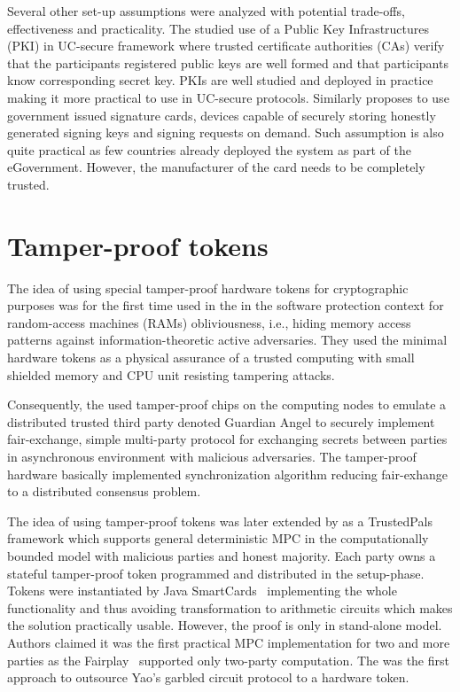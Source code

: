 \documentclass[
  digital, %
  twoside, %
  table,   %
  lof,     %
  lot,     %
]{fithesis3}
\begin{document}
Several other set-up assumptions were analyzed with potential trade-offs, effectiveness and practicality. The \cite{BCNP04} studied use of a Public Key Infrastructures (PKI) in UC-secure framework where trusted certificate authorities (CAs) verify that the participants registered public keys are well formed and that participants know corresponding secret key. PKIs are well studied and deployed in practice making it more practical to use in UC-secure protocols. Similarly \cite{HUU07} proposes to use government issued signature cards, devices capable of securely storing honestly generated signing keys and signing requests on demand. Such assumption is also quite practical as few countries already deployed the system as part of the eGovernment. However, the manufacturer of the card needs to be completely trusted.

\section{Tamper-proof tokens}
The idea of using special tamper-proof hardware tokens for cryptographic purposes was for the first time used in the \cite{GO96} in the software protection context for random-access machines (RAMs) obliviousness, i.e., hiding memory access patterns against information-theoretic active adversaries. They used the minimal hardware tokens as a physical assurance of a trusted computing with small shielded memory and CPU unit resisting tampering attacks.

Consequently, the \cite{AV04} used tamper-proof chips on the computing nodes to emulate a distributed trusted third party denoted Guardian Angel to securely implement fair-exchange, simple multi-party protocol for exchanging secrets between parties in asynchronous environment with malicious adversaries. The tamper-proof hardware basically implemented synchronization algorithm reducing fair-exhange to a distributed consensus problem. 

The idea of using tamper-proof tokens was later extended by \cite{FFPBK06} as a TrustedPals framework which supports general deterministic MPC in the computationally bounded model with malicious parties and honest majority. Each party owns a stateful tamper-proof token programmed and distributed in the setup-phase. Tokens were instantiated by Java SmartCards~\cite{DW99} implementing the whole functionality and thus avoiding transformation to arithmetic circuits which makes the solution practically usable. However, the proof is only in stand-alone model. Authors claimed it was the first practical MPC implementation for two and more parties as the Fairplay~\cite{MNPS04} supported only two-party computation.
The \cite{JKSS10} was the first approach to outsource Yao's garbled circuit protocol to a hardware token.
\end{document}
